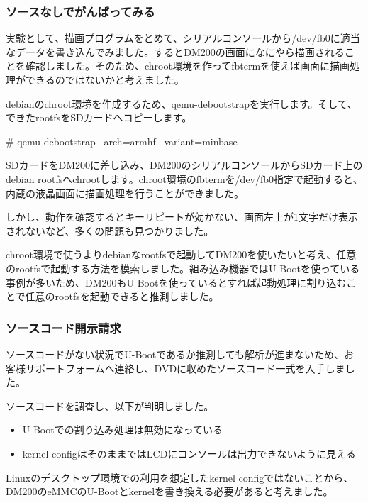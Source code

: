 \documentclass[mingoth,a4paper]{jsarticle}
\begin{document}
\subsubsection{ソースなしでがんばってみる}

実験として、描画プログラムをとめて、シリアルコンソールから/dev/fb0に適当なデータを書き込んでみました。するとDM200の画面になにやら描画されることを確認しました。そのため、chroot環境を作ってfbtermを使えば画面に描画処理ができるのではないかと考えました。

debianのchroot環境を作成するため、qemu-debootstrapを実行します。そして、できたrootfsをSDカードへコピーします。

\begin{commandline}
# qemu-debootstrap --arch=armhf --variant=minbase
\end{commandline}

SDカードをDM200に差し込み、DM200のシリアルコンソールからSDカード上のdebian rootfsへchrootします。chroot環境のfbtermを/dev/fb0指定で起動すると、内蔵の液晶画面に描画処理を行うことができました。


しかし、動作を確認するとキーリピートが効かない、画面左上が1文字だけ表示されないなど、多くの問題も見つかりました。


chroot環境で使うよりdebianなrootfsで起動してDM200を使いたいと考え、任意のrootfsで起動する方法を模索しました。組み込み機器ではU-Bootを使っている事例が多いため、DM200もU-Bootを使っているとすれば起動処理に割り込むことで任意のrootfsを起動できると推測しました。


\subsubsection{ソースコード開示請求}

ソースコードがない状況でU-Bootであるか推測しても解析が進まないため、お客様サポートフォームへ連絡し、DVDに収めたソースコード一式を入手しました。

ソースコードを調査し、以下が判明しました。

\begin{itemize}
\item U-Bootでの割り込み処理は無効になっている
\item kernel configはそのままではLCDにコンソールは出力できないように見える
\end{itemize}

Linuxのデスクトップ環境での利用を想定したkernel configではないことから、DM200のeMMCのU-Bootとkernelを書き換える必要があると考えました。
\end{document}
